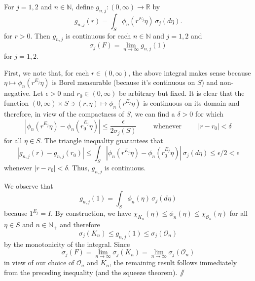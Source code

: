 \documentclass[smallextended]{svjour3}
\theoremstyle{remark}
\renewcommand*{\qedsymbol}{\hfill$\mathbin{/\mkern-6mu/}$}
\renewenvironment{subproof}[1][\proofname]{\renewcommand\xsubproofname{#1}\xsubproof}{\endxsubproof}
\renewenvironment{proof}[1][\proofname]{\renewcommand\xproofname{#1}\xproof}{\endxproof}
\begin{document}
\begin{proof}
\begin{lemma}\label{lem:IndepProof}
For $j=1,2$ and $n\in\mathbb{N}$, define $g_{n,j}:(0,\infty)\to\mathbb{R}$ by
\begin{equation*}
g_{n,j}(r)=\int_S\phi_n(r^{E_j}\eta)\,\sigma_j(d\eta).
\end{equation*}
for $r>0$. Then $g_{n,j}$ is continuous for each $n\in\mathbb{N}$ and $j=1,2$ and
\begin{equation*}
    \sigma_j(F)=\lim_{n\to\infty}g_{n,j}(1)
\end{equation*}
for $j=1,2$.
\end{lemma}
\begin{subproof}[Proof]
First, we note that, for each $r\in (0,\infty)$, the above integral makes sense because $\eta\mapsto \phi_n(r^{E_j}\eta)$ is Borel measurable (because it's continuous on $S$) and non-negative. Let $\epsilon>0$ and $r_0\in (0,\infty)$ be arbitrary but fixed. It is clear that the function $(0,\infty)\times S\ni (r,\eta)\mapsto \phi_n(r^{E_j}\eta)$ is continuous on its domain and therefore, in view of the compactness of $S$, we can find a $\delta>0$ for which
\begin{equation*}
|\phi_n(r^{E_j}\eta)-\phi_n(r_0^{E_j}\eta)|\leq\frac{\epsilon}{2\sigma_j(S)}\hspace{1cm}\mbox{whenever}\hspace{1cm}|r-r_0|<\delta
\end{equation*}
for all $\eta\in S$. The triangle inequality guarantees that
\begin{equation*}
|g_{n,j}(r)-g_{n,j}(r_0)|\leq \int_S|\phi_n(r^{E_j}\eta)-\phi_n(r_0^{E_j}\eta)|\,\sigma_j(d \eta)\leq\epsilon/2<\epsilon
\end{equation*}
whenever $|r-r_0|<\delta$. Thus, $g_{n,j}$ is continuous.

We observe that
\begin{equation*}
g_{n,j}(1)=\int_{S}\phi_n(\eta)\,\sigma_j(d\eta)
\end{equation*}
because $1^{E_j}=I$. By construction, we have $\chi_{K_n}(\eta)\leq\phi_{n}(\eta)\leq \chi_{\mathcal{O}_n}(\eta)$ for all $\eta\in S$ and $n\in\mathbb{N}_+$ and therefore
\begin{equation*}
\sigma_j(K_n)\leq g_{n,j}(1)\leq \sigma_j(\mathcal{O}_n)
\end{equation*}
by the monotonicity of the integral. Since
\begin{equation*}
\sigma_j(F)=\lim_{n\to\infty}\sigma_j(K_n)=\lim_{n\to\infty}\sigma_j(\mathcal{O}_n)
\end{equation*}
in view of our choice of $\mathcal{O}_n$ and $K_n$, the remaining result follows immediately from the preceding inequality (and the squeeze theorem). \qedsymbol
\end{subproof}


\end{proof}
\end{document}
